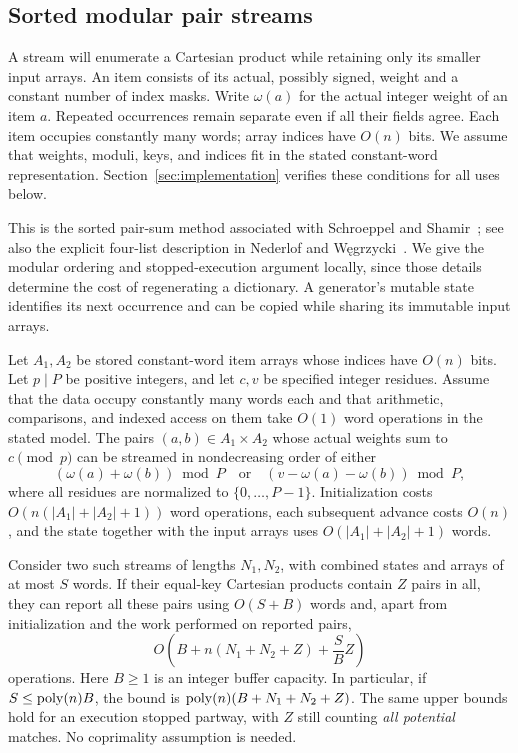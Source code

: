 \subsection{Sorted modular pair streams}
\label{sec:streams}

A stream will enumerate a Cartesian product while retaining only its
smaller input arrays. An item consists of its actual, possibly signed,
weight and a constant number of index masks. Write $\omega(a)$ for
the actual integer weight of an item $a$. Repeated occurrences
remain separate even if all their fields agree. Each item occupies
constantly many words; array indices have $O(n)$ bits. We assume that
weights, moduli, keys, and indices fit in the stated constant-word
representation. Section~\ref{sec:implementation} verifies these
conditions for all uses below.

This is the sorted pair-sum method associated with Schroeppel and
Shamir~\cite{SS81}; see also the explicit four-list description in
Nederlof and W\k{e}grzycki~\cite[full version, Lemmas~3.3 and~A.1]{NW21}.
We give the modular ordering and stopped-execution argument locally,
since those details determine the cost of regenerating a dictionary.
A generator's mutable state identifies its next occurrence and can be
copied while sharing its immutable input arrays.

\begin{lemma}
\label{lem:streams}
Let $A_1,A_2$ be stored constant-word item arrays whose indices have
$O(n)$ bits. Let $p\mid P$ be positive integers, and let $c,v$ be
specified integer residues. Assume that the data occupy constantly
many words each and that arithmetic, comparisons, and indexed access
on them take $O(1)$ word operations in the stated model. The pairs $(a,b)\in A_1\times A_2$
whose actual weights sum to $c\pmod p$ can be streamed in
nondecreasing order of either
\[
 (\omega(a)+\omega(b))\bmod P
 \quad\text{or}\quad
 (v-\omega(a)-\omega(b))\bmod P,
\]
where all residues are normalized to $\{0,\ldots,P-1\}$.
Initialization costs $O(n(|A_1|+|A_2|+1))$ word operations, each
subsequent advance costs $O(n)$, and the state together with the
input arrays uses $O(|A_1|+|A_2|+1)$ words.

Consider two such streams of lengths $N_1,N_2$, with combined states
and arrays of at most $S$ words. If their equal-key Cartesian
products contain $Z$ pairs in all, they can report all these pairs
using $O(S+B)$ words and, apart from initialization and the work
performed on reported pairs,
\begin{equation}
\label{eq:tie-cost}
 O\left(B+n(N_1+N_2+Z)+\frac SB Z\right)
\end{equation}
operations. Here $B\ge1$ is an integer buffer capacity. In
particular, if $S\le\operatorname{poly}(n)B$, the bound is
$\operatorname{poly}(n)(B+N_1+N_2+Z)$. The same upper bounds hold for an execution
stopped partway, with $Z$ still counting \emph{all potential} matches.
No coprimality assumption is needed.
\end{lemma}

